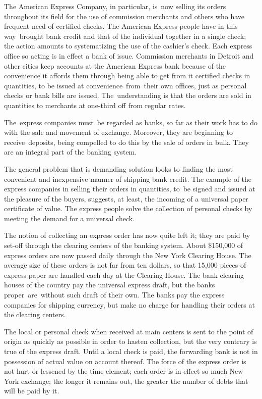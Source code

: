 \documentclass[twoside,symmetric,nobib,justified]{tufte-book}
\begin{document}
The American Express Company, in particular, is~now selling its orders
throughout its field for the use of commission merchants and others who
have frequent need of certified checks. The American Express people have
in this way~brought bank credit and that of the individual together in a
single check; the action amounts to systematizing the use of the
cashier's check. Each express office so acting is in effect a bank of
issue. Commission merchants in Detroit and other cities keep accounts at
the American Express bank because of the convenience it affords them
through being able to get from it certified checks in quantities, to be
issued at convenience~from~their own offices, just as personal checks or
bank bills are issued. The~understanding is that the orders are sold in
quantities to merchants at one-third off from regular rates.~

The~express companies must~be regarded as banks, so far as their
work has to do with the sale and movement of exchange. Moreover, they
are beginning to receive~deposits, being compelled to do this by the
sale of orders in bulk. They are an integral part of the banking
system.~

The general problem that is demanding solution looks to finding the most
convenient and inexpensive manner of shipping bank credit. The example
of the express companies in selling their orders in quantities, to~be
signed and issued at the pleasure of the buyers, suggests, at least, the
incoming of a universal paper certificate of value. The express people
solve the collection of personal checks by meeting the demand for a
universal check.~

The notion of collecting an express order has now quite left it; they
are paid by set-off through the clearing centers of the banking system.
About \$150,000 of express orders are now passed daily through the New
York Clearing House. The average size of these orders is not far from
ten dollars, so that 15,000 pieces of express paper are handled each day
at the Clearing House. The bank clearing houses of the country pay the
universal express draft, but the banks proper~are~without such draft of
their own. The banks pay the express companies for shipping currency,
but make no charge for handling their orders at the clearing centers.~

The local or personal check when received at main centers is sent to the
point of origin as quickly as possible in order to hasten collection,
but the very contrary is true of the express draft. Until a local check
is paid, the forwarding bank is not in possession of actual value on
account thereof. The force of the express order is not hurt or lessened
by the time element; each order is in effect so much New York exchange;
the longer it remains out, the greater the number of debts that will be
paid by it. ~
\end{document}
